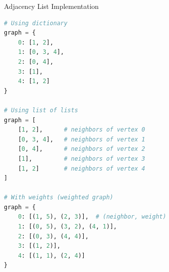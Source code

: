 \documentclass[aspectratio=169]{beamer}
\begin{document}
\begin{frame}[fragile]{Adjacency List Implementation}
  \begin{lstlisting}[language=Python, basicstyle=\ttfamily\small]
# Using dictionary
graph = {
    0: [1, 2],
    1: [0, 3, 4],
    2: [0, 4],
    3: [1],
    4: [1, 2]
}

# Using list of lists
graph = [
    [1, 2],      # neighbors of vertex 0
    [0, 3, 4],   # neighbors of vertex 1
    [0, 4],      # neighbors of vertex 2
    [1],         # neighbors of vertex 3
    [1, 2]       # neighbors of vertex 4
]

# With weights (weighted graph)
graph = {
    0: [(1, 5), (2, 3)],  # (neighbor, weight)
    1: [(0, 5), (3, 2), (4, 1)],
    2: [(0, 3), (4, 4)],
    3: [(1, 2)],
    4: [(1, 1), (2, 4)]
}
  \end{lstlisting}
\end{frame}
\end{document}

